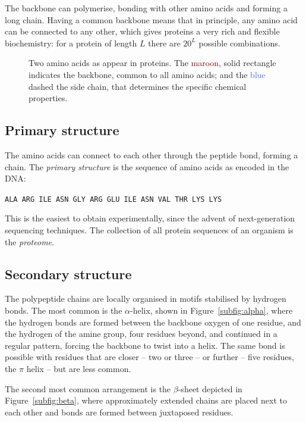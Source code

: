 The backbone can polymerise, bonding with other amino acids and forming a long chain.
Having a common backbone means that in principle, any amino acid can be connected to any other, which gives proteins a very rich and flexible biochemistry:
for a protein of length $L$ there are $20^L$ possible combinations. %

\begin{figure}
\centering
\hfil %
\hfil %
\hfil %
\caption{Two amino acids as appear in proteins.
The \textcolor{Maroon}{maroon}, solid rectangle indicates the backbone, common to all amino acids; and the \textcolor{RoyalBlue}{blue} dashed the side chain, that determines the specific chemical properties.}\label{fig:amino_acids}
\end{figure}

\subsection{Primary structure}
The amino acids can connect to each other through the peptide bond, forming a chain.
The \emph{primary structure} is the sequence of amino acids as encoded in the DNA:
\begin{center}
\texttt{ALA ARG ILE ASN GLY ARG GLU ILE ASN VAL THR LYS LYS}
\end{center}

This is the easiest to obtain experimentally, since the advent of next-generation sequencing techniques.
The collection of all protein sequences of an organism is the \emph{proteome}.


\subsection{Secondary structure}
The polypeptide chains are locally organised in motifs stabilised by hydrogen bonds.
The most common is the $\alpha$-helix, \marginpar{$\alpha$} shown in Figure~\ref{subfig:alpha}, where the hydrogen bonds are formed between the backbone oxygen of one residue, and the hydrogen of the amine group, four residues beyond, and continued in a regular pattern, forcing the backbone to twist into a helix.
The same bond is possible with residues that are closer -- two or three -- or further  -- five residues, the $\pi$ helix -- but are less common.

The second most common arrangement is the $\beta$-sheet  \marginpar{$\beta$} depicted in Figure~\ref{subfig:beta}, where approximately extended chains are placed next to each other and bonds are formed between juxtaposed residues.


